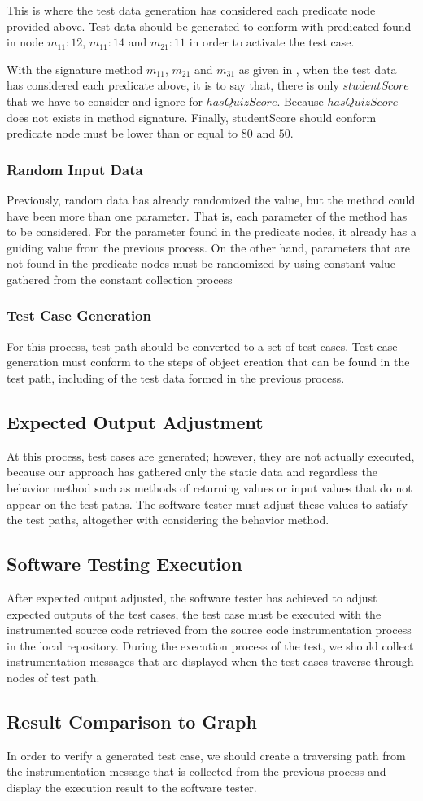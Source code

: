 This is where the test data generation has considered each predicate node provided above. 
Test data should be generated to conform with predicated found in node $m_{11}:12$, 
$m_{11}:14$ and $m_{21}:11$ in order to activate the test case.

With the signature method $m_{11}$, $m_{21}$ and $m_{31}$ as given in , 
when the test data has considered each predicate above, it is to say that, there is only $studentScore$ 
that we have to consider and ignore for $hasQuizScore$. Because $hasQuizScore$ does not exists in 
method signature. Finally, studentScore should conform predicate node must be lower than 
or equal to $80$ and $50$.


\subsubsection{Random Input Data}
Previously, random data has already randomized the value, but the method could have been more 
than one parameter. That is, each parameter of the method has to be considered. For the parameter 
found in the predicate nodes, it already has a guiding value from the previous process. 
On the other hand, parameters that are not found in the predicate nodes must be randomized 
by using constant value gathered from the constant collection process \cite{Ma2016}

\subsubsection{Test Case Generation}
For this process, test path should be converted to a set of test cases. Test case generation 
must conform to the steps of object creation that can be found in the test path, 
including of the test data formed in the previous process.

\subsection{Expected Output Adjustment}
At this process, test cases are generated; however, they are not actually executed, 
because our approach has gathered only the static data and regardless the behavior method 
such as methods of returning values or input values that do not appear on the test paths. 
The software tester must adjust these values to satisfy the test paths, altogether 
with considering the behavior method.

\subsection{Software Testing Execution}
After expected output adjusted, the software tester has achieved to adjust expected outputs 
of the test cases, the test case must be executed with the instrumented source code 
retrieved from the source code instrumentation process in the local repository. During 
the execution process of the test, we should collect instrumentation messages 
that are displayed when the test cases traverse through nodes of test path.

\subsection{Result Comparison to Graph}
In order to verify a generated test case, we should create a traversing path from 
the instrumentation message that is collected from the previous process and display 
the execution result to the software tester.

